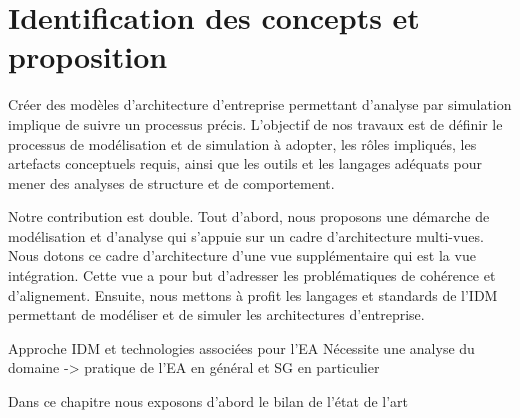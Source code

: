 \chapter{Identification des concepts et proposition}
\label{ch:demarche}

\PartialToc



Créer des modèles d'architecture d'entreprise permettant d'analyse par
simulation implique de suivre un processus précis. L'objectif de nos travaux est
de définir le processus de modélisation et de simulation à adopter, les rôles
impliqués, les artefacts conceptuels requis, ainsi que les outils et les
langages adéquats pour mener des analyses de structure et de comportement.

Notre contribution est double. Tout d'abord, nous proposons une démarche de
modélisation et d'analyse qui s'appuie sur un cadre d'architecture multi-vues.
Nous dotons ce cadre d'architecture d'une vue supplémentaire qui est la vue
intégration. Cette vue a pour but d'adresser les problématiques de cohérence et
d'alignement. Ensuite, nous mettons à profit les langages et standards de l'IDM
permettant de modéliser et de simuler les architectures d'entreprise.

	Approche IDM et technologies associées pour l'EA Nécessite une analyse du
	domaine -> pratique de l'EA en général et SG en particulier


Dans ce chapitre nous exposons d'abord le bilan de l'état de l'art





















